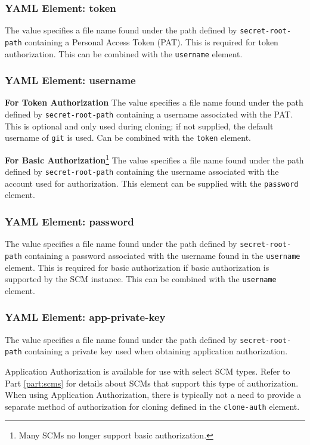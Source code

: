 \subsubsection{YAML Element: token}\label{sec:yaml-api-auth-token}
The value specifies a file name found under the path defined by \texttt{secret-root-path} 
containing a Personal Access Token (PAT).  This is required for token authorization.  This can
be combined with the \texttt{username} element.


\subsubsection{YAML Element: username}\label{sec:yaml-api-auth-username}

\textbf{For Token Authorization}
The value specifies a file name found under the path defined by \texttt{secret-root-path} containing a username associated with the PAT.
This is optional and only used during cloning; if not supplied, the default username of \texttt{git} is used. Can be combined with 
the \texttt{token} element.


\textbf{For Basic Authorization}\footnote{Many SCMs no longer support basic authorization.}
The value specifies a file name found under the path defined by \texttt{secret-root-path} containing the username associated with the account used
for authorization.  This element can be supplied with the \texttt{password} element.

\subsubsection{YAML Element: password}\label{sec:yaml-api-auth-password}
The value specifies a file name found under the path defined by \texttt{secret-root-path} 
containing a password associated with the username found in the \texttt{username} element.  
This is required for basic authorization if basic authorization is supported by the SCM instance.
This can be combined with the \texttt{username} element.


\subsubsection{YAML Element: app-private-key}\label{sec:yaml-api-auth-app-private-key}
The value specifies a file name found under the path defined by \texttt{secret-root-path} containing a private key used
when obtaining application authorization. 

Application Authorization is available for use with select SCM types. Refer to Part \ref{part:scms} for details about SCMs
that support this type of authorization. When using Application Authorization, there is typically not a need to provide a separate 
method of authorization for cloning defined in the \texttt{clone-auth} element. 
